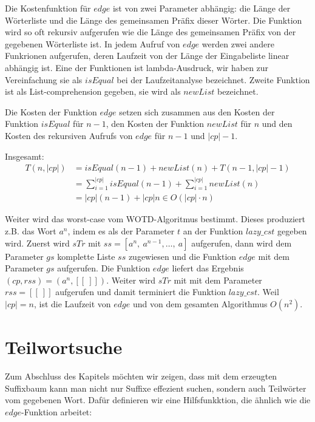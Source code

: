 \documentclass[12pt]{report}
\newcommand{\abs}[1]{\left|#1\right|}
\begin{document}
Die Kostenfunktion für $edge$ ist von zwei Parameter abhängig: die Länge der Wörterliste und die Länge des gemeinsamen Präfix dieser Wörter. Die Funktion wird so oft rekursiv aufgerufen wie die Länge des gemeinsamen Präfix von der gegebenen Wörterliste ist. In jedem Aufruf von $edge$ werden zwei andere Funkrionen aufgerufen, deren Laufzeit von der Länge der Eingabeliste linear abhängig ist. Eine der Funktionen ist lambda-Ausdruck, wir haben zur Vereinfachung sie als $isEqual$ bei der Laufzeitanalyse bezeichnet. Zweite Funktion ist als List-comprehension gegeben, sie wird als $newList$ bezeichnet.

Die Kosten der Funktion $edge$ setzen sich zusammen aus den Kosten der Funktion $isEqual$ für $n - 1$, den Kosten der Funktion $newList$ für $n$ und den Kosten des rekursiven Aufrufs von $edge$ für $n - 1$ und $\abs{cp} - 1$.

Insgesamt:
\begin{align*}
    T(n,\abs{cp}) &= isEqual(n - 1) + newList(n) + T(n-1,\abs{cp}-1) \\
                  &= \sum_{i = 1}^{\abs{cp}}{isEqual(n-1)} + \sum_{i = 1}^{\abs{cp}}{newList(n)}\\
                  &= \abs{cp} (n - 1) + \abs{cp} n \in O(\abs{cp} \cdot n)
\end{align*}

Weiter wird das worst-case vom WOTD-Algoritmus bestimmt. Dieses produziert z.B. das Wort $a^n$, indem es als der Parameter $t$ an der Funktion $lazy\_cst$ gegeben wird. Zuerst wird $sTr$ mit $ss = [a^n,\:a^{n-1}, \dots ,\:a]$ aufgerufen, dann wird dem Parameter $gs$ komplette Liste $ss$ zugewiesen und die Funktion $edge$ mit dem Parameter $gs$ aufgerufen. Die Funktion $edge$ liefert das Ergebnis $(cp,rss) = (a^n, [[\:]])$. Weiter wird $sTr$ mit mit dem Parameter $rss = [[\:]]$ aufgerufen und damit terminiert die Funktion $lazy\_cst$. Weil $|cp| = n$, ist die Laufzeit von $edge$ und von dem gesamten Algorithmus $O(n^2)$.

\section{Teilwortsuche}
\label{sec:Teilwortsuche}

Zum Abschluss des Kapitels möchten wir zeigen, dass mit dem erzeugten Suffixbaum kann man nicht nur Suffixe effezient suchen, sondern auch Teilwörter vom gegebenen Wort. Dafür definieren wir eine Hilfsfunkktion, die ähnlich wie die $edge$-Funktion arbeitet:
\end{document}
